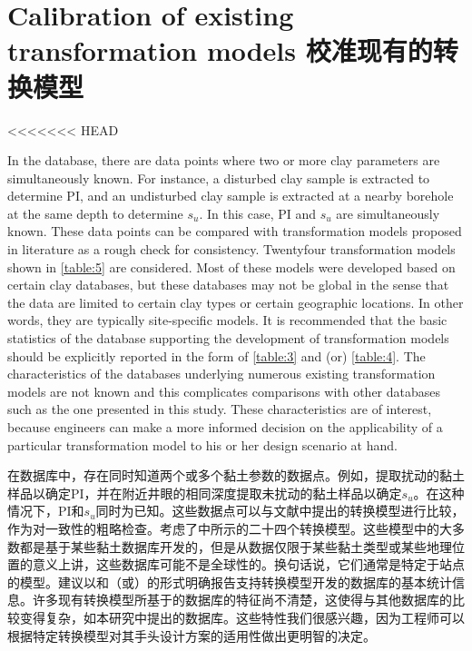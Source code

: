 \section{Calibration of existing transformation models 校准现有的转换模型}

<<<<<<< HEAD
\begin{paracol}{2}
        
    In the database, there are data points where two or more clay parameters are simultaneously known. For instance, a disturbed clay sample is extracted to determine PI, and an undisturbed clay sample is extracted at a nearby borehole at the same depth to determine $s_u$. In this case, PI and $s_u$ are simultaneously known. These data points can be compared with transformation models proposed in literature as a rough check for consistency. Twentyfour transformation models shown in \autoref{table:5} are considered. Most of these models were developed based on certain clay databases, but these databases may not be global in the sense that the data are limited to certain clay types or certain geographic locations. In other words, they are typically site-specific models. It is recommended that the basic statistics of the database supporting the development of transformation models should be explicitly reported in the form of \autoref{table:3} and (or) \autoref{table:4}. The characteristics of the databases underlying numerous existing transformation models are not known and this complicates comparisons with other databases such as the one presented in this study. These characteristics are of interest, because engineers can make a more informed decision on the applicability of a particular transformation model to his or her design scenario at hand.
    
    \switchcolumn
        
    在数据库中，存在同时知道两个或多个黏土参数的数据点。例如，提取扰动的黏土样品以确定PI，并在附近井眼的相同深度提取未扰动的黏土样品以确定$s_u$。在这种情况下，PI和$s_u$同时为已知。这些数据点可以与文献中提出的转换模型进行比较，作为对一致性的粗略检查。考虑了中所示的二十四个转换模型。这些模型中的大多数都是基于某些黏土数据库开发的，但是从数据仅限于某些黏土类型或某些地理位置的意义上讲，这些数据库可能不是全球性的。换句话说，它们通常是特定于站点的模型。建议以和（或）的形式明确报告支持转换模型开发的数据库的基本统计信息。许多现有转换模型所基于的数据库的特征尚不清楚，这使得与其他数据库的比较变得复杂，如本研究中提出的数据库。这些特性我们很感兴趣，因为工程师可以根据特定转换模型对其手头设计方案的适用性做出更明智的决定。
    

\end{paracol}
